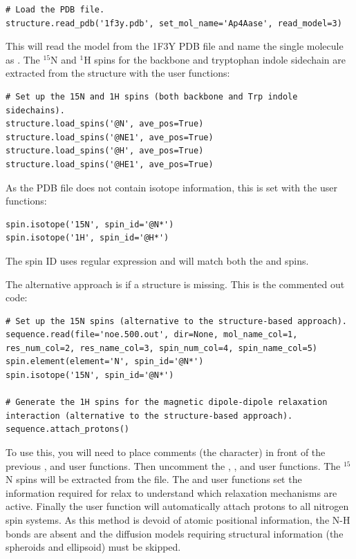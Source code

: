 \begin{lstlisting}[firstnumber=161]
# Load the PDB file.
structure.read_pdb('1f3y.pdb', set_mol_name='Ap4Aase', read_model=3)
\end{lstlisting}

This will read the  model from the 1F3Y PDB file and name the single molecule as .
The $^{15}$N and $^1$H spins for the backbone and tryptophan indole sidechain are extracted from the structure with the user functions:

\begin{lstlisting}[firstnumber=164]
# Set up the 15N and 1H spins (both backbone and Trp indole sidechains).
structure.load_spins('@N', ave_pos=True)
structure.load_spins('@NE1', ave_pos=True)
structure.load_spins('@H', ave_pos=True)
structure.load_spins('@HE1', ave_pos=True)
\end{lstlisting}

As the PDB file does not contain isotope information, this is set with the user functions:

\begin{lstlisting}[firstnumber=169]
spin.isotope('15N', spin_id='@N*')
spin.isotope('1H', spin_id='@H*')
\end{lstlisting}

The spin ID  uses regular expression and will match both the  and  spins.

The alternative approach is if a structure is missing.
This is the commented out code:

\begin{lstlisting}[firstnumber=172]
# Set up the 15N spins (alternative to the structure-based approach).
sequence.read(file='noe.500.out', dir=None, mol_name_col=1, res_num_col=2, res_name_col=3, spin_num_col=4, spin_name_col=5)
spin.element(element='N', spin_id='@N*')
spin.isotope('15N', spin_id='@N*')

# Generate the 1H spins for the magnetic dipole-dipole relaxation interaction (alternative to the structure-based approach).
sequence.attach_protons()
\end{lstlisting}

To use this, you will need to place comments (the \pycode{\#} character) in front of the previous ,  and  user functions.
Then uncomment the , ,  and  user functions.
The $^{15}$N spins will be extracted from the  file.
The  and  user functions set the information required for relax to understand which relaxation mechanisms are active.
Finally the  user function will automatically attach protons to all nitrogen spin systems.
As this method is devoid of atomic positional information, the N-H bonds are absent and the diffusion models requiring structural information (the spheroids and ellipsoid) must be skipped.


